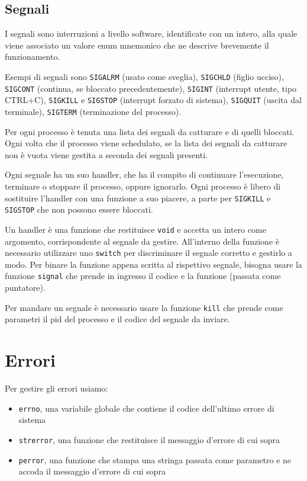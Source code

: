 \documentclass[11pt]{article}
\begin{document}
\subsection{Segnali}

I segnali sono interruzioni a livello software, identificate con un intero, alla quale viene associato un valore enum mnemonico che ne descrive brevemente il funzionamento.

Esempi di segnali sono \verb|SIGALRM| (usato come sveglia), \verb|SIGCHLD| (figlio ucciso), \verb|SIGCONT| (continua, se bloccato precedentemente), \verb|SIGINT| (interrupt utente, tipo CTRL+C), \verb|SIGKILL| e \verb|SIGSTOP| (interrupt forzato di sistema), \verb|SIGQUIT| (uscita dal terminale), \verb|SIGTERM| (terminazione del processo).

Per ogni processo è tenuta una lista dei segnali da catturare e di quelli bloccati. Ogni volta che il processo viene schedulato, se la lista dei segnali da catturare non è vuota viene gestita a seconda dei segnali presenti.

Ogni segnale ha un suo handler, che ha il compito di continuare l'esecuzione, terminare o stoppare il processo, oppure ignorarlo. Ogni processo è libero di sostituire l'handler con una funzione a suo piacere, a parte per \verb|SIGKILL| e \verb|SIGSTOP| che non possono essere bloccati.

Un handler è una funzione che restituisce \verb|void| e accetta un intero come argomento, corrispondente al segnale da gestire. All'interno della funzione è necessario utilizzare uno \verb|switch| per discriminare il segnale corretto e gestirlo a modo. Per binare la funzione appena scritta al rispettivo segnale, bisogna usare la funzione \verb|signal| che prende in ingresso il codice e la funzione (passata come puntatore).

Per mandare un segnale è necessario usare la funzione \verb|kill| che prende come parametri il pid del processo e il codice del segnale da inviare.

\section{Errori}

Per gestire gli errori usiamo:

\begin{itemize}
    \item \verb|errno|, una variabile globale che contiene il codice dell'ultimo errore di sistema
    \item \verb|strerror|, una funzione che restituisce il messaggio d'errore di cui sopra
    \item \verb|perror|, una funzione che stampa una stringa passata come parametro e ne accoda il messaggio d'errore di cui sopra
\end{itemize}
\end{document}
